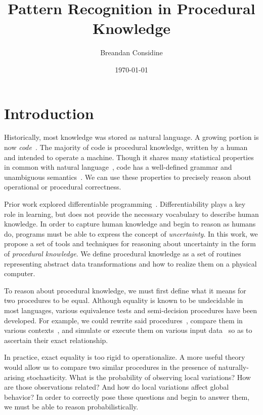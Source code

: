 \documentclass[11pt]{article}
\title{Pattern Recognition in Procedural Knowledge}
\author{Breandan Considine}
\date{\today}
\begin{document}
    \maketitle

    \tableofcontents
    \pagebreak


    \section{Introduction}

    Historically, most knowledge was stored as natural language. A growing portion is now \textit{code}~\citep{allamanis2018survey}. The majority of code is procedural knowledge, written by a human and intended to operate a machine. Though it shares many statistical properties in common with natural language~\citep{hindle2012naturalness}, code has a well-defined grammar and unambiguous semantics~\citep{pierce2010software}. We can use these properties to precisely reason about operational or procedural correctness.

    Prior work explored differentiable programming~\citep{considine2019programming}. Differentiability plays a key role in learning, but does not provide the necessary vocabulary to describe human knowledge. In order to capture human knowledge and begin to reason as humans do, programs must be able to express the concept of \textit{uncertainty}. In this work, we propose a set of tools and techniques for reasoning about uncertainty in the form of \textit{procedural knowledge}. We define procedural knowledge as a set of routines representing abstract data transformations and how to realize them on a physical computer.

    To reason about procedural knowledge, we must first define what it means for two procedures to be equal. Although equality is known to be undecidable in most languages, various equivalence tests and semi-decision procedures have been developed. For example, we could rewrite said procedures~\citep{baader1999term}, compare them in various contexts~\citep{felleisen1990expressive}, and simulate or execute them on various input data~\citep{chen2020metamorphic} so as to ascertain their exact relationship.

    In practice, exact equality is too rigid to operationalize. A more useful theory would allow us to compare two similar procedures in the presence of naturally-arising stochasticity. What is the probability of observing local variations? How are those observations related? And how do local variations affect global behavior? In order to correctly pose these questions and begin to answer them, we must be able to reason probabilistically.
\end{document}
